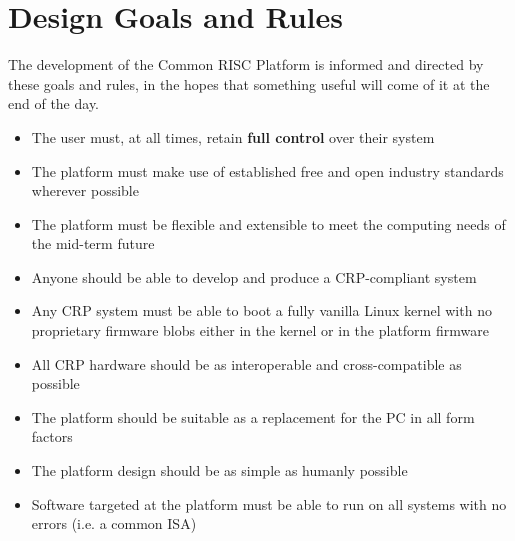 \documentclass[12pt]{report}
\begin{document}
\section{Design Goals and Rules}
The development of the Common RISC Platform is informed and directed by these goals and rules, in the
hopes that something useful will come of it at the end of the day.

\begin{itemize}
	\item The user must, at all times, retain \textbf{full control} over their system
	\item The platform must make use of established free and open industry standards wherever possible
	\item The platform must be flexible and extensible to meet the computing needs of the mid-term future
	\item Anyone should be able to develop and produce a CRP-compliant system
	\item Any CRP system must be able to boot a fully vanilla Linux kernel with no proprietary firmware blobs
	either in the kernel or in the platform firmware
	\item All CRP hardware should be as interoperable and cross-compatible as possible
	\item The platform should be suitable as a replacement for the PC in all form factors
	\item The platform design should be as simple as humanly possible
	\item Software targeted at the platform must be able to run on all systems with no errors (i.e. a common ISA)
\end{itemize}
\end{document}
